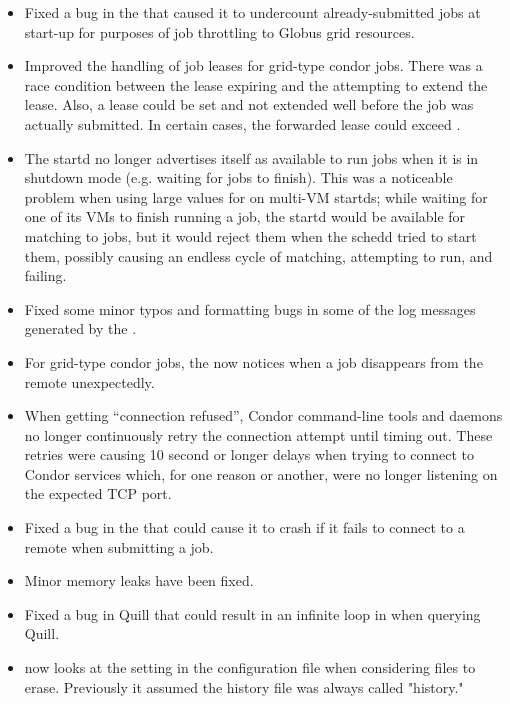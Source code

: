\begin{itemize}
\item Fixed a bug in the  that caused it to undercount
already-submitted jobs at start-up for purposes of job throttling to Globus
grid resources.

\item Improved the handling of job leases for grid-type condor jobs. There
was a race condition between the lease expiring and the
 attempting to extend the lease. Also, a lease could
be set and not extended well before the job was actually submitted. In
certain cases, the forwarded lease could exceed .

\item The startd no longer advertises itself as available to run jobs
when it is in shutdown mode (e.g. waiting for jobs to finish).  This
was a noticeable problem when using large values for
 on multi-VM startds; while waiting for
one of its VMs to finish running a job, the startd would be available
for matching to jobs, but it would reject them when the schedd tried
to start them, possibly causing an endless cycle of matching, attempting
to run, and failing.

\item Fixed some minor typos and formatting bugs in some of the log
  messages generated by the .

\item For grid-type condor jobs, the  now notices
when a job disappears from the remote  unexpectedly.

\item When getting ``connection refused'', Condor command-line tools
and daemons no longer continuously retry the connection attempt until
timing out.  These retries were causing 10 second or longer delays
when trying to connect to Condor services which, for one reason or
another, were no longer listening on the expected TCP port.

\item Fixed a bug in the  that could cause it to crash
if it fails to connect to a remote  when submitting a
job.

\item Minor memory leaks have been fixed.

\item Fixed a bug in Quill that could result in an infinite loop in
 when querying Quill.

\item {} now looks at the  setting in the configuration file when considering files to erase.  Previously it assumed the history file was always called "history."

\end{itemize}

